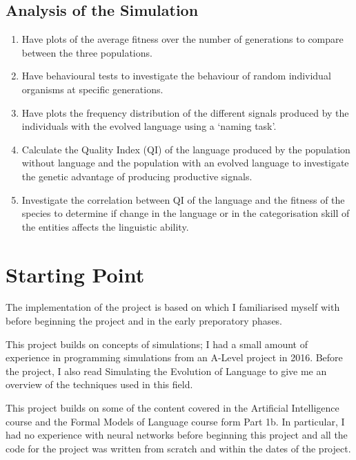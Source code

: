 \documentclass[12pt,a4paper,twoside,openright]{report}
\begin{document}
\subsection*{Analysis of the Simulation}

\begin{enumerate}

\item Have plots of the average fitness over the number of generations to compare between the three populations.

\item Have behavioural tests to investigate the behaviour of random individual organisms at specific generations.

\item Have plots the frequency distribution of the different signals produced by the individuals with the evolved language using a `naming task'.

\item Calculate the Quality Index (QI) of the language produced by the population without language and the population with an evolved language to investigate the genetic advantage of producing productive signals. 

\item Investigate the correlation between QI of the language and the fitness of the species to determine if change in the language or in the categorisation skill of the entities affects the linguistic ability.

\end{enumerate}

\section{Starting Point}\label{section:starting}

The implementation of the project is based on \citet{Cangelosi1998} which I familiarised myself with before beginning the project and in the early preporatory phases.

This project builds on concepts of simulations; I had a small amount of experience in programming simulations from an A-Level project in 2016. Before the project, I also read Simulating the Evolution of Language \citep{Cangelosi2002} to give me an overview of the techniques used in this field. 

This project builds on some of the content covered in the Artificial Intelligence course and the Formal Models of Language course form Part 1b. In particular, I had no experience with neural networks before beginning this project and all the code for the project was written from scratch and within the dates of the project.
\end{document}
